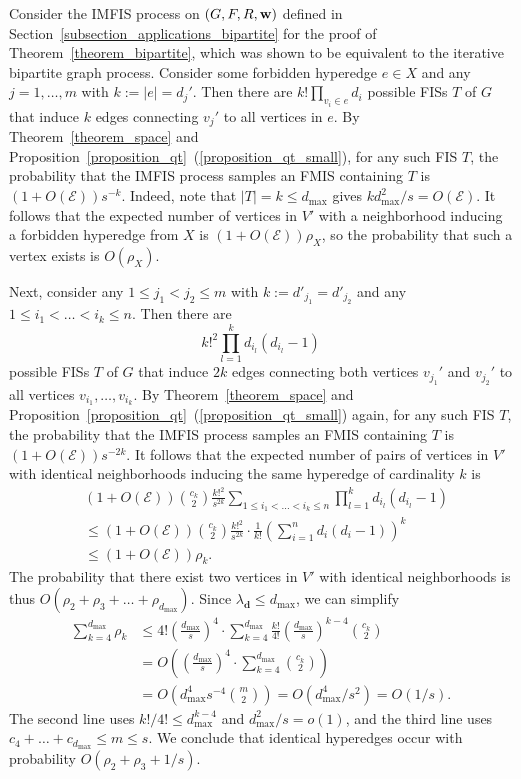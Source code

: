 \documentclass{article}
\theoremstyle{plain}
\theoremstyle{remark}
\theoremstyle{plain}
\numberwithin{equation}{section}
\renewcommand{\d}{{\boldsymbol{d}}}
\renewcommand{\b}{{\bf{w}}}
\begin{document}
	Consider the IMFIS process on $(G,F,R,\b)$ defined in Section~\ref{subsection_applications_bipartite} for the proof of Theorem~\ref{theorem_bipartite}, which was shown to be equivalent to the iterative bipartite graph process. Consider some forbidden hyperedge $e\in X$ and any $j=1,\ldots,m$ with $k:=|e|=d_j'$. Then there are $k!\prod_{v_i\in e}d_i$ possible FISs $T$ of $G$ that induce $k$ edges connecting $v_j'$ to all vertices in $e$. By Theorem~\ref{theorem_space} and Proposition~\ref{proposition_qt}~(\ref{proposition_qt_small}), for any such FIS $T$, the probability that the IMFIS process samples an FMIS containing $T$ is $(1+O(\mathscr{E}))s^{-k}$. Indeed, note that $|T|=k\leq d_{\max}$ gives $kd_{\max}^2/s=O(\mathscr{E})$. It follows that the expected number of vertices in $V'$ with a neighborhood inducing a forbidden hyperedge from $X$ is $(1+O(\mathscr{E}))\rho_X$, so the probability that such a vertex exists is $O(\rho_X)$.
	
	Next, consider any $1\leq j_1<j_2\leq m$ with $k:=d'_{j_1}=d'_{j_2}$ and any $1\leq i_1<\ldots<i_k\leq n$. Then there are $$k!^2\prod_{l=1}^kd_{i_l}(d_{i_l}-1)$$ possible FISs $T$ of $G$ that induce $2k$ edges connecting both vertices $v_{j_1}'$ and $v_{j_2}'$ to all vertices $v_{i_1},\ldots,v_{i_k}$. By Theorem~\ref{theorem_space} and Proposition~\ref{proposition_qt}~(\ref{proposition_qt_small}) again, for any such FIS $T$, the probability that the IMFIS process samples an FMIS containing $T$ is $(1+O(\mathscr{E}))s^{-2k}$. It follows that the expected number of pairs of vertices in $V'$ with identical neighborhoods inducing the same hyperedge of cardinality $k$ is
	\begin{align}
		&(1+O(\mathscr{E}))\binom{c_k}{2}\frac{k!^2}{s^{2k}}\sum_{1\leq i_1<\ldots<i_k\leq n}\prod_{l=1}^{k}d_{i_l}(d_{i_l}-1)
		\\&\leq(1+O(\mathscr{E}))\binom{c_k}{2}\frac{k!^2}{s^{2k}}\cdot\frac1{k!}\left(\sum_{i=1}^{n}d_{i}(d_{i}-1)\right)^k
		\\&\leq(1+O(\mathscr{E}))\rho_k.
	\end{align}
	The probability that there exist two vertices in $V'$ with identical neighborhoods is thus $O(\rho_2+\rho_3+\ldots+\rho_{d_{\max}})$. Since $\lambda_{\d}\leq d_{\max}$, we can simplify
	\begin{align}
		\sum_{k=4}^{d_{\max}}\rho_k&\leq4!\left(\frac{d_{\max}}{s}\right)^4\cdot\sum_{k=4}^{d_{\max}}\frac{k!}{4!}\left(\frac{d_{\max}}{s}\right)^{k-4}\binom{c_k}{2}
		\\&=O\left(\left(\frac{d_{\max}}{s}\right)^4\cdot\sum_{k=4}^{d_{\max}}\binom{c_k}{2}\right)
		\\&=O\left(d_{\max}^4s^{-4}\binom{m}{2}\right)=O(d_{\max}^4/s^2)=O(1/s).
	\end{align}
	The second line uses $k!/4!\leq d_{\max}^{k-4}$ and $d_{\max}^2/s=o(1)$, and the third line uses $c_4+\ldots+c_{d_{\max}}\leq m\leq s$. We conclude that identical hyperedges occur with probability $O(\rho_2+\rho_3+1/s)$.
	
\end{document}
